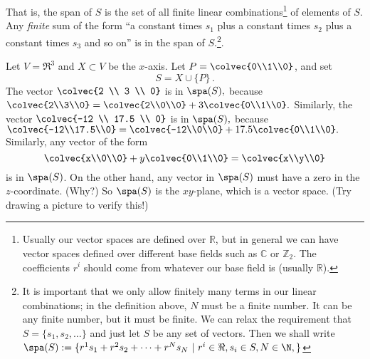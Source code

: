 That is, the span of \(S\) is the set of all finite linear combinations\footnote{Usually our vector spaces are defined over \(\mathbb{R}\), but in general we can have vector spaces defined over different base fields such as \(\mathbb{C}\) or \(\mathbb{Z}_2\). The coefficients \(r^i\) should come from whatever our base field is (usually \(\mathbb{R}\)).} of elements of \(S\). Any {\it finite} sum of the form ``a constant times \(s_1\) plus a constant times \(s_2\) plus a constant times \(s_3\) and so on'' is in the span of \(S\).\footnote{It is important that we only allow finitely many terms in our linear combinations; in the definition above, \(N\) must be a finite number. It can be any finite number, but it must be finite. We can relax the requirement that $S=\{s_1,s_2,\ldots\}$ and just let $S$ be any set of vectors. Then we shall write $\spa(S):=\{ r^1s_1+r^2s_2+\cdots + r^Ns_N ~|~ r^i\in \Re, s_i\in S, N\in \N, \}$
 }.

\begin{example}
Let $V=\Re^3$ and $X\subset V$ be the $x$-axis.  Let $P=\colvec{0\\1\\0}$, and set \[S=X \cup \{P\}\, .\]
The vector \(\colvec{2 \\ 3 \\ 0}\) is in \(\spa(S),\) because \(\colvec{2\\3\\0}=\colvec{2\\0\\0}+3\colvec{0\\1\\0}.\) Similarly, the vector \(\colvec{-12 \\ 17.5 \\ 0}\) is in \(\spa(S),\) because \(\colvec{-12\\17.5\\0}=\colvec{-12\\0\\0}+17.5\colvec{0\\1\\0}.\)
Similarly, any vector of the form
\[
\colvec{x\\0\\0}+y \colvec{0\\1\\0} = \colvec{x\\y\\0}
\]
is in \(\spa(S)\). On the other hand, any vector in \(\spa(S)\) must have a zero in the \(z\)-coordinate. (Why?) 
So $\spa(S)$ is the $xy$-plane, which is a vector space.  (Try drawing a picture to verify this!)
\end{example}

